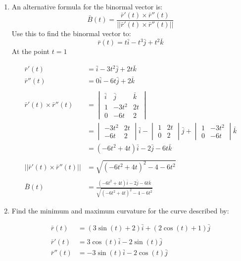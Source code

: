 \documentclass[a4paper,11pt]{article}
\begin{document}
\begin{preview}
\begin{enumerate}
\begin{enumerate}
        
        \item An alternative formula for the binormal vector is:
        $$ \bar{B}(t) = \frac{\bar{r}'(t) \times \bar{r}''(t)}{|| \bar{r}'(t) \times \bar{r}''(t) ||} $$
        Use this to find the binormal vector to:
        $$ \bar{r}(t) = t\bar{i} -t^3\bar{j} + t^2\bar{k} $$
        At the point $t = 1$

        \begin{align*}
            \bar{r}'(t) &= \bar{i} - 3t^2\bar{j} + 2t\bar{k}\\
            \bar{r}''(t) &= 0\bar{i} - 6t\bar{j} + 2\bar{k}\\\\
            \bar{r}'(t) \times \bar{r}''(t) &=  
            \begin{vmatrix}
                \bar{i} & \bar{j} & \bar{k}\\
                1 & -3t^2 & 2t \\
                0 & -6t & 2
            \end{vmatrix}\\
            &= \begin{vmatrix}
                -3t^2 & 2t \\
                -6t & 2
            \end{vmatrix} \bar{i}
            -\begin{vmatrix}
                1 & 2t\\
                0 & 2
            \end{vmatrix} \bar{j}
            +  \begin{vmatrix}
                1 & -3t^2\\
                0 & -6t
            \end{vmatrix}\bar{k}\\
            &=(-6t^2 + 4t)\bar{i} - 2\bar{j} - 6t\bar{k} \\\\
            || \bar{r}'(t) \times \bar{r}''(t) || &= \sqrt{(-6t^2 + 4t)^2 - 4 - 6t^2}\\\\
            \bar{B}(t) &= \frac{(-6t^2 + 4t)\bar{i} - 2\bar{j} - 6t\bar{k}}{\sqrt{(-6t^2 + 4t)^2 - 4 - 6t^2}}
        \end{align*}

        \item Find the minimum and maximum curvature for the curve described by:
        

        \begin{align*}
            \bar{r}(t) &= (3\sin(t) +2)\bar{i} + (2\cos(t)+1)\bar{j}\\\\
            \bar{r}'(t) &= 3\cos(t)\bar{i} -2\sin(t)\bar{j}\\
            \bar{r}''(t) &= -3\sin(t)\bar{i} -2\cos(t)\bar{j}\\
        \end{align*}
        

\end{enumerate}
\end{enumerate}
\end{preview}
\end{document}
